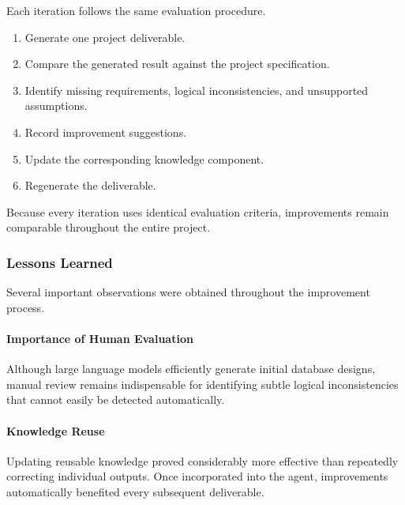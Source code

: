 Each iteration follows the same evaluation procedure.

\begin{enumerate}

	\item Generate one project deliverable.

	\item Compare the generated result against the project specification.

	\item Identify missing requirements, logical inconsistencies, and unsupported assumptions.

	\item Record improvement suggestions.

	\item Update the corresponding knowledge component.

	\item Regenerate the deliverable.

\end{enumerate}

Because every iteration uses identical evaluation criteria, improvements remain comparable throughout the entire project.

\subsubsection{Lessons Learned}

Several important observations were obtained throughout the improvement process.

\paragraph{Importance of Human Evaluation}

Although large language models efficiently generate initial database designs, manual review remains indispensable for identifying subtle logical inconsistencies that cannot easily be detected automatically.

\paragraph{Knowledge Reuse}

Updating reusable knowledge proved considerably more effective than repeatedly correcting individual outputs. Once incorporated into the agent, improvements automatically benefited every subsequent deliverable.

